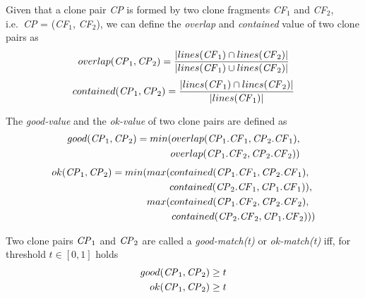 \documentclass[sigconf,review, anonymous]{acmart}
\newcommand{\squeezeup}{\vspace{-0.5mm}}
\begin{document}
Given that a clone pair \textit{CP} is formed by two clone fragments
\textit{CF$_1$} and \textit{CF$_2$}, i.e.~\textit{CP} = (\textit{CF$_1$},
\textit{CF$_2$}), we can define the \textit{overlap} and
\textit{contained} value of two clone pairs as
\begin{displaymath}
  overlap(\textrm{\textit{CP}}_1, \textrm{\textit{CP}}_2) = \frac{|lines(\textrm{\textit{CF}}_1) \cap lines(\textrm{\textit{CF}}_2)|}{|lines(\textrm{\textit{CF}}_1) \cup lines(\textrm{\textit{CF}}_2)|} 
\end{displaymath}
\begin{displaymath}
  contained(\textrm{\textit{CP}}_1, \textrm{\textit{CP}}_2) = \frac{|lines(\textrm{\textit{CF}}_1) \cap lines(\textrm{\textit{CF}}_2)|}{|lines(\textrm{\textit{CF}}_1)|}
\end{displaymath}
      
\noindent%
The \textit{good-value}  and the \textit{ok-value}  of two clone pairs are defined as
\begin{align*}
	good(\textrm{\textit{CP}}_1, \textrm{\textit{CP}}_2) = min(overlap(\textrm{\textit{CP}}_1.\textrm{\textit{CF}}_1,\textrm{\textit{CP}}_2.\textrm{\textit{CF}}_1), \\ overlap(\textrm{\textit{CP}}_1.\textrm{\textit{CF}}_2,\textrm{\textit{CP}}_2.\textrm{\textit{CF}}_2))
\end{align*}
\begin{align*}
	ok(\textrm{\textit{CP}}_1,\textrm{\textit{CP}}_2) = min(max(contained(\textrm{\textit{CP}}_1.\textrm{\textit{CF}}_1,\textrm{\textit{CP}}_2.\textrm{\textit{CF}}_1),~~ \\ contained(\textrm{\textit{CP}}_2.\textrm{\textit{CF}}_1,\textrm{\textit{CP}}_1.\textrm{\textit{CF}}_1)),~
	\\ max(contained(\textrm{\textit{CP}}_1.\textrm{\textit{CF}}_2,\textrm{\textit{CP}}_2.\textrm{\textit{CF}}_2),~~ \\contained(\textrm{\textit{CP}}_2.\textrm{\textit{CF}}_2,\textrm{\textit{CP}}_1.\textrm{\textit{CF}}_2)))
\end{align*}

\noindent%
Two clone pairs $\textrm{\textit{CP}}_1$ and $\textrm{\textit{CP}}_2$
are called a \textit{\textit{good-match}(t)} or \textit{ok-match(t)}  iff, for threshold $t \in [0,1]$ holds 
\begin{align*}
good(\textrm{\textit{CP}}_1,\textrm{\textit{CP}}_2) & \geq t\\
ok(\textrm{\textit{CP}}_1,\textrm{\textit{CP}}_2) & \geq t
\end{align*}
\end{document}
